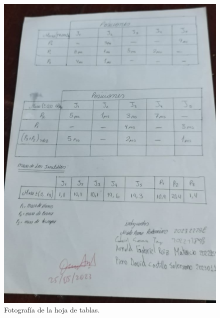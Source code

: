 \documentclass[../main.tex]{subfiles}
\begin{document}
\begin{figure}[H]
    \centering
    \includegraphics[width=0.6\linewidth]{resources/anexo.jpg}
    \caption{Fotografía de la hoja de tablas.}
\end{figure}
\end{document}
